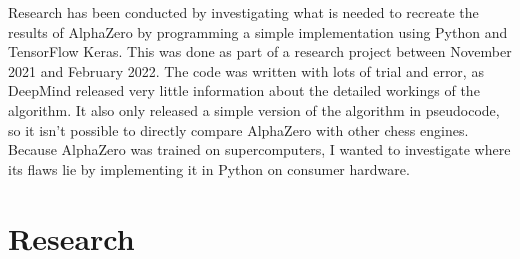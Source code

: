 \documentclass{article}
\begin{document}
Research has been conducted by investigating what is needed to recreate the results of AlphaZero
by programming a simple implementation using Python and TensorFlow Keras. This was done as part of a research project
between November 2021 and February 2022. The code was written with lots of trial and error, as DeepMind released 
very little information about the detailed workings of the algorithm. It also only released a simple version of 
the algorithm in pseudocode, so it isn't possible to directly compare AlphaZero with other chess engines.
Because AlphaZero was trained on supercomputers, I wanted to investigate where its flaws lie by 
implementing it in Python on consumer hardware.



\newpage
\section{Research}
\end{document}
